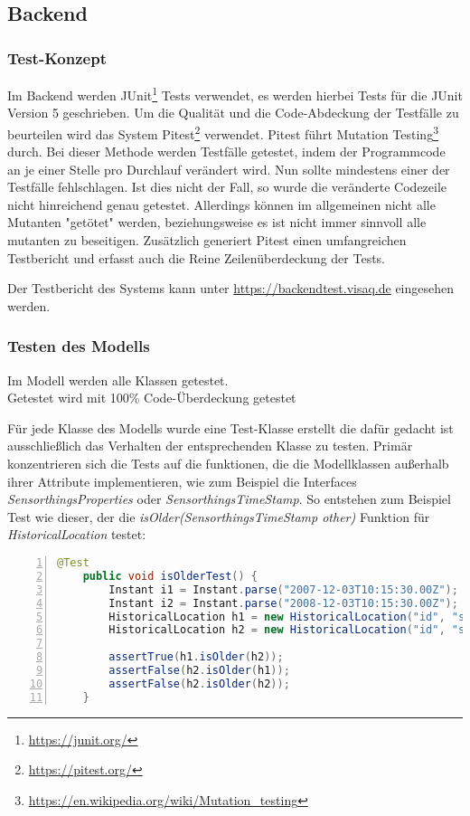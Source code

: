 \subsection{Backend}
\subsubsection{Test-Konzept}
Im Backend werden JUnit\footnote{\url{https://junit.org/}} Tests verwendet, es werden hierbei Tests für die JUnit Version 5 geschrieben.
Um die Qualität und die Code-Abdeckung der Testfälle zu beurteilen wird das System Pitest\footnote{\url{https://pitest.org/}} verwendet.
Pitest führt Mutation Testing\footnote{\url{https://en.wikipedia.org/wiki/Mutation_testing}} durch.
Bei dieser Methode werden Testfälle getestet, indem der Programmcode an je einer Stelle pro Durchlauf verändert wird.
Nun sollte mindestens einer der Testfälle fehlschlagen.
Ist dies nicht der Fall, so wurde die veränderte Codezeile nicht hinreichend genau getestet.
Allerdings können im allgemeinen nicht alle Mutanten "getötet" werden, beziehungsweise es ist nicht immer sinnvoll alle mutanten zu beseitigen.
Zusätzlich generiert Pitest einen umfangreichen Testbericht und erfasst auch die Reine Zeilenüberdeckung der Tests.

Der Testbericht des Systems kann unter \url{https://backendtest.visaq.de} eingesehen werden.

\subsubsection{Testen des Modells}
Im Modell werden alle Klassen getestet.
\\
Getestet wird mit 100\% Code-Überdeckung getestet

Für jede Klasse des Modells wurde eine Test-Klasse erstellt die dafür gedacht ist ausschließlich das Verhalten der entsprechenden Klasse zu testen.
Primär konzentrieren sich die Tests auf die funktionen, die die Modellklassen außerhalb ihrer Attribute implementieren, wie zum Beispiel die Interfaces \textit{SensorthingsProperties} oder \textit{SensorthingsTimeStamp}.
So entstehen zum Beispiel Test wie dieser, der die \textit{isOlder(SensorthingsTimeStamp other)} Funktion für \textit{HistoricalLocation} testet:
\begin{lstlisting}[language=java,
    basicstyle=\normalfont\ttfamily,
    numbers=left,
    numberstyle=\scriptsize,
    stepnumber=1,
    numbersep=8pt,
    showstringspaces=false,
    breaklines=true,
    frame=lines,
    backgroundcolor=\color{background}]
    @Test
    public void isOlderTest() {
        Instant i1 = Instant.parse("2007-12-03T10:15:30.00Z");
        Instant i2 = Instant.parse("2008-12-03T10:15:30.00Z");
        HistoricalLocation h1 = new HistoricalLocation("id", "selfUrl", false, i1, null, null);
        HistoricalLocation h2 = new HistoricalLocation("id", "selfUrl", false, i2, null, null);

        assertTrue(h1.isOlder(h2));
        assertFalse(h2.isOlder(h1));
        assertFalse(h2.isOlder(h2));
    }
\end{lstlisting}

